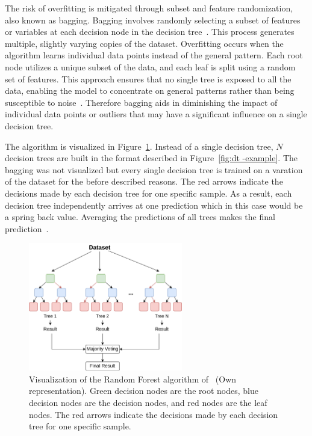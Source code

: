 The risk of overfitting is mitigated through subset and feature randomization, also known as bagging.
Bagging involves randomly selecting a subset of features or variables at each decision node in the decision
tree~\cite[p. 341]{gareth2013introduction}.
This process generates multiple, slightly varying copies of the dataset.
Overfitting occurs when the algorithm learns individual data points instead of
the general pattern.
Each root node utilizes a unique subset of the data, and each leaf is split using a random set of features.
This approach ensures that no single tree is exposed to all the data, enabling the model to concentrate on general
patterns rather than being susceptible to noise~\cite[p. 251]{liu_newmachinelearning_2012}.
Therefore bagging aids in diminishing the impact of individual data points or outliers that may have a
significant influence on a single decision tree.

The algorithm is visualized in Figure~\ref{fig:rf-example}.
Instead of a single decision tree, $N$ decision trees are built in the format described in Figure~\ref{fig:dt -example}.
The bagging was not visualized but every single decision tree is trained on a varation of the dataset for the before
described reasons.
The red arrows indicate the decisions made by each decision tree for one specific sample.
As a result, each decision tree independently arrives at one prediction which in this case would be a spring back value.
Averaging the predictions of all trees makes the final prediction~\cite[p. 9]{breiman_randomforests_2001}.

\begin{figure}[h]
    \begin{tcolorbox}[arc=0pt,boxrule=0.5pt]
        \centering
        \includegraphics[width=0.6\textwidth]{chap4/images/random_forest_example}
    \end{tcolorbox}
    \caption{Visualization of the Random Forest algorithm of~\cite[p.1]{breiman_randomforests_2001} (Own
    representation).
    Green decision nodes are the root nodes, blue decision nodes are the decision nodes, and red nodes are the leaf
    nodes.
    The red arrows indicate the decisions made by each decision tree for one specific sample.}
    \label{fig:rf-example}
\end{figure}

